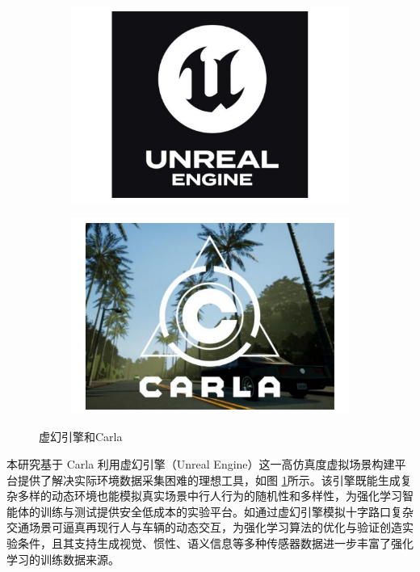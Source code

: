 \begin{figure}[H]
    \centering
    \begin{subfigure}{0.48\textwidth}
        \includegraphics[width=\linewidth]{images/Unreal_Engine.pdf}
    \end{subfigure}
    \hfill 
    \begin{subfigure}{0.48\textwidth}
        \includegraphics[width=\linewidth]{images/Carla.pdf}
    \end{subfigure}
    \caption{虚幻引擎和Carla}
    \label{fig:CarlaUE}
\end{figure}

本研究基于 Carla 利用虚幻引擎（Unreal Engine）这一高仿真度虚拟场景构建平台提供了解决实际环境数据采集困难的理想工具，如图 \ref{fig:CarlaUE}所示。该引擎既能生成复杂多样的动态环境也能模拟真实场景中行人行为的随机性和多样性，为强化学习智能体的训练与测试提供安全低成本的实验平台。如通过虚幻引擎模拟十字路口复杂交通场景可逼真再现行人与车辆的动态交互，为强化学习算法的优化与验证创造实验条件，且其支持生成视觉、惯性、语义信息等多种传感器数据进一步丰富了强化学习的训练数据来源。

